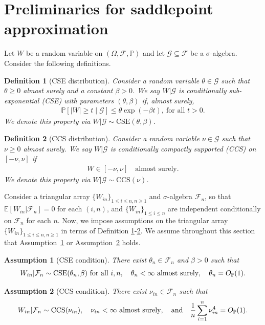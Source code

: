\documentclass[12pt]{article}
\newtheorem{assumption}{Assumption}
\newtheorem{definition}{Definition}
\theoremstyle{definition}
\def\P{\mathbb{P}}
\def\P{\mathbb{P}}
\newcommand{\E}{\mathbb E}								%
\renewcommand{\P}{\mathbb{P}}							%
\begin{document}
\section{Preliminaries for saddlepoint approximation}\label{sec:saddlepoint_prelim}

Let $W$ be a random variable on $(\Omega, \mathcal F, \P)$ and let $\mathcal G \subseteq \mathcal F$ be a $\sigma$-algebra. Consider the following definitions.

\begin{definition}[CSE distribution]\label{def:cse_distribution}
Consider a random variable $\theta \in \mathcal G$ such that $\theta \geq 0$ almost surely and a constant $\beta > 0$. We say $W|\mathcal{G}$ is \textit{conditionally sub-exponential} (CSE) with parameters $(\theta, \beta)$ if, almost surely,
\begin{align*}
\P\left[|W|\geq t \mid \mathcal{G}\right]\leq \theta\exp(-\beta t),\ \text{for all } t>0.
\end{align*}
We denote this property via $W|\mathcal G \sim \text{CSE}(\theta, \beta)$.
\end{definition}

\begin{definition}[CCS distribution]\label{def:ccs_distribution}
	Consider a random variable $\nu \in \mathcal G$ such that $\nu \geq 0$ almost surely. We say $W|\mathcal{G}$ is \textit{conditionally compactly supported} (CCS) on $[-\nu, \nu]$ if
\begin{align*}
W \in [-\nu,\nu] \quad \text{almost surely}.
\end{align*}
We denote this property via $W|\mathcal G \sim \text{CCS}(\nu)$.
\end{definition}

Consider a triangular array $\{W_{in}\}_{1 \leq i \leq n, n \geq 1}$ and $\sigma$-algebra $\mathcal{F}_n$, so that $\E[W_{in}|\mathcal{F}_n] = 0$ for each $(i, n)$, and $\{W_{in}\}_{1 \leq i \leq n}$ are independent conditionally on $\mathcal{F}_n$ for each $n$. Now, we impose assumptions on the triangular array $\{W_{in}\}_{1 \leq i \leq n, n \geq 1}$ in terms of Definition \ref{def:cse_distribution}-\ref{def:ccs_distribution}. We assume throughout this section that Assumption~\ref{assu:cse} or Assumption~\ref{assu:ccs} holds.
\begin{assumption}[CSE condition]\label{assu:cse}
There exist $\theta_n \in \mathcal F_n$ and $\beta > 0$ such that 
\begin{equation}\label{eq:cse_condition}
W_{in}|\mathcal F_n \sim \textnormal{CSE}(\theta_n, \beta) \text{ for all } i, n, \quad \theta_n < \infty \text{ almost surely}, \quad \theta_n = O_{\P}(1).
\end{equation}
\end{assumption}
\begin{assumption}[CCS condition]\label{assu:ccs}
There exist $\nu_{in} \in \mathcal F_n$ such that 
\begin{align}\label{eq:ccs_condition}
W_{in}|\mathcal F_n \sim \textnormal{CCS}(\nu_{in}), \quad \nu_{in}<\infty\ \text{almost surely}, \quad \text{and} \quad \frac{1}{n}\sum_{i=1}^n \nu_{in}^4=O_{\P}(1).
\end{align}
\end{assumption}
\end{document}
